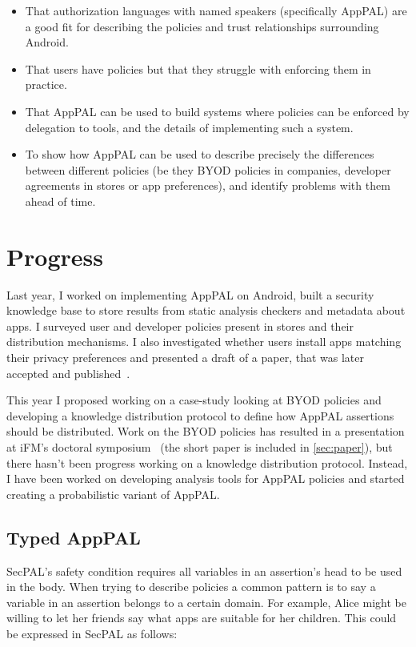 \documentclass[a4paper]{scrartcl}
\begin{document}
\begin{itemize}
\item That authorization languages with named speakers (specifically AppPAL) are
  a good fit for describing the policies and trust relationships surrounding
  Android.
\item That users have policies but that they struggle with enforcing them in
  practice.
\item That AppPAL can be used to build systems where policies can be
  enforced by delegation to tools, and the details of implementing such a system.
\item To show how AppPAL can be used to describe precisely the differences
  between different policies (be they BYOD policies in companies, developer
  agreements in stores or app preferences), and identify problems
  with them ahead of time.
\end{itemize}

\section{Progress}
\label{sec:work}

Last year, I worked on implementing AppPAL on Android, built a security
knowledge base to store results from static analysis checkers and metadata about
apps. I surveyed user and developer policies present in stores and
their distribution mechanisms. I also investigated whether users install apps
matching their privacy preferences and presented a draft of a paper, that was
later accepted and published~\cite{hallett_apppal_2016}.

This year I proposed working on a case-study looking at BYOD policies and
developing a knowledge distribution protocol to define how AppPAL assertions
should be distributed.  Work on the BYOD policies has resulted in a presentation
at iFM's doctoral symposium~\cite{hallett_specifying_2016} (the short paper is
included in \autoref{sec:paper}), but there hasn't
been progress working on a knowledge distribution protocol.  Instead, I have been
worked on developing analysis tools for AppPAL policies and started creating a
probabilistic variant of AppPAL.

\subsection{Typed AppPAL}
\label{sec:types}

SecPAL's safety condition requires all variables in an assertion's head to be
used in the body. When trying to describe policies a common pattern is to say a
variable in an assertion belongs to a certain domain. For example, Alice might
be willing to let her friends say what apps are suitable for her children. This
could be expressed in SecPAL as follows:
\end{document}
